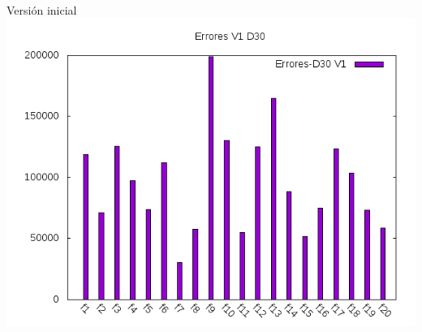 \documentclass[10pt]{beamer}
\begin{document}
\begin{frame}[fragile]{Versión inicial}
		\includegraphics[scale=0.25]{./Imagenes/Errores/errores_v1_d30.png}
	\end{frame}
\end{document}
